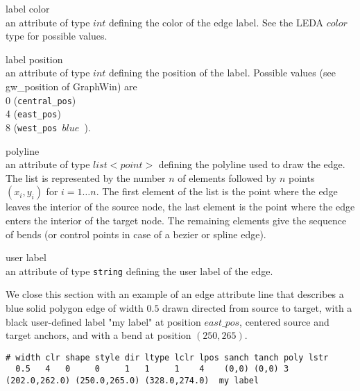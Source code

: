 \begin{description}
\item{label color}\\
an attribute of type $int$ defining the color of the edge label.
See the LEDA $color$ type for possible values.


\item{label position}\\
an attribute of type $int$ defining the position of the label. 
Possible values (see {gw\_position} of GraphWin) are\\ 
0 ({\tt central\_pos})\\
4 ({\tt east\_pos})\\
8 ({\tt west\_pos $blue$ }).

\item{polyline}\\
an attribute of type $list<point>$ defining the polyline used to
draw the edge. The list is represented by the number $n$ of elements
followed by $n$ points $(x_i,y_i)$ for $i=1\ldots n$. The first
element of the list is the point where the edge leaves the
interior of the source node, the last element is the point where
the edge enters the interior of the target node. The remaining
elements give the sequence of bends (or control points
in case of a bezier or spline edge). 


\item{user label}\\
an attribute of type {\tt string} defining the user 
label of the edge.

\end{description}

We close this section with an example of an edge attribute line
that describes a blue solid polygon edge of width $0.5$ drawn directed
from source to target, with a black user-defined label "my label"
at position $east\_pos$, centered source and target anchors,
and with a bend at position $(250,265)$.
\begin{verbatim}
# width clr shape style dir ltype lclr lpos sanch tanch poly lstr
  0.5   4   0     0     1   1     1    4    (0,0) (0,0) 3 (202.0,262.0) (250.0,265.0) (328.0,274.0)  my label
\end{verbatim}


